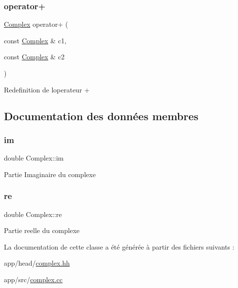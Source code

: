 \subsubsection{\texorpdfstring{operator+}{operator+}}
{\footnotesize\ttfamily \hyperlink{classComplex}{Complex} operator+ (\begin{DoxyParamCaption}\item[{const \hyperlink{classComplex}{Complex} \&}]{c1,  }\item[{const \hyperlink{classComplex}{Complex} \&}]{c2 }\end{DoxyParamCaption})\hspace{0.3cm}{\ttfamily [friend]}}

Redefinition de l\textquotesingle{}operateur + 

\subsection{Documentation des données membres}
\mbox{\label{classComplex_a776d595d5a1b576e9136cbc6bac0589c}} 
\subsubsection{\texorpdfstring{im}{im}}
{\footnotesize\ttfamily double Complex\+::im\hspace{0.3cm}{\ttfamily [private]}}

Partie Imaginaire du complexe \mbox{\label{classComplex_a843ce2f85af4c57db9063c86f3cd9607}} 
\subsubsection{\texorpdfstring{re}{re}}
{\footnotesize\ttfamily double Complex\+::re\hspace{0.3cm}{\ttfamily [private]}}

Partie reelle du complexe 

La documentation de cette classe a été générée à partir des fichiers suivants \+:\begin{DoxyCompactItemize}
\item 
app/head/\hyperlink{complex_8hh}{complex.\+hh}\item 
app/src/\hyperlink{complex_8cc}{complex.\+cc}\end{DoxyCompactItemize}
